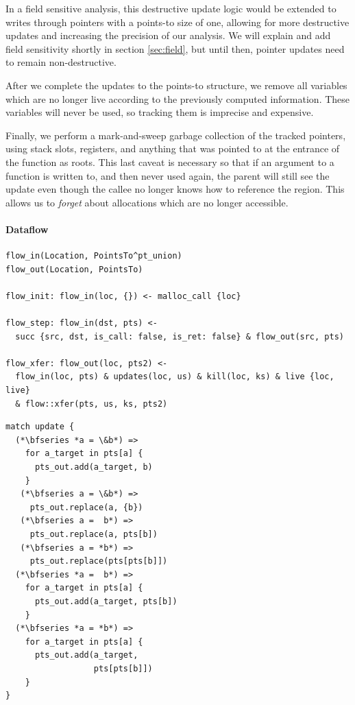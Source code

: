 In a field sensitive analysis, this destructive update logic would be
extended to writes through pointers with a points-to size of one,
allowing for more destructive updates and increasing the precision of
our analysis.
We will explain and add field sensitivity shortly in section \ref{sec:field}, but until then, pointer updates need to remain non-destructive.

After we complete the updates to the points-to structure, we remove
all variables which are no longer live according to the previously computed information.
These variables will never be used, so tracking them is imprecise and expensive.

Finally, we perform a mark-and-sweep garbage collection of the tracked pointers, using stack slots, registers, and anything that was pointed to at the entrance of the function as roots.
This last caveat is necessary so that if an argument to a function is written to, and then never used again, the parent will still see the update even though the callee no longer knows how to reference the region.
This allows us to \emph{forget} about allocations which are no longer accessible.

\paragraph{Dataflow}
\begin{lstlisting}[float=*t, caption={Flow Sensitive Pointer Analysis Rules}, label=lst:flowrules]
flow_in(Location, PointsTo^pt_union)
flow_out(Location, PointsTo)

flow_init: flow_in(loc, {}) <- malloc_call {loc}

flow_step: flow_in(dst, pts) <-
  succ {src, dst, is_call: false, is_ret: false} & flow_out(src, pts)

flow_xfer: flow_out(loc, pts2) <-
  flow_in(loc, pts) & updates(loc, us) & kill(loc, ks) & live {loc, live}
  & flow::xfer(pts, us, ks, pts2)
\end{lstlisting}
\begin{lstlisting}[float=t, caption={Process Update}, label=lst:process]
match update {
  (*\bfseries *a = \&b*) =>
    for a_target in pts[a] {
      pts_out.add(a_target, b)
    }
   (*\bfseries a = \&b*) =>
     pts_out.replace(a, {b})
   (*\bfseries a =  b*) =>
     pts_out.replace(a, pts[b])
   (*\bfseries a = *b*) =>
     pts_out.replace(pts[pts[b]])
  (*\bfseries *a =  b*) =>
    for a_target in pts[a] {
      pts_out.add(a_target, pts[b])
    }
  (*\bfseries *a = *b*) =>
    for a_target in pts[a] {
      pts_out.add(a_target,
                  pts[pts[b]])
    }
}
\end{lstlisting}

